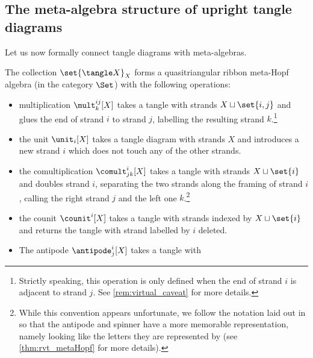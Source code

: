 \subsection{The meta-algebra structure of upright tangle diagrams}

Let us now formally connect tangle diagrams with meta-algebras.

\begin{theorem}
        \label{thm:tangles_meta_algebra}
        The collection $\set{\tangle X}_X$ forms a quasitriangular ribbon
        meta-Hopf algebra (in the category $\Set$) with the following
        operations:
        \begin{itemize}
                \item multiplication $\mult^{ij}_{k}[X]$ takes a tangle with
                        strands $X\sqcup\set{i,j}$ and glues the end of strand
                        $i$ to strand $j$, labelling the resulting strand
                        $k$.\footnote{Strictly speaking, this operation is only
                        defined when the end of strand $i$ is adjacent to strand
                        $j$. See \cref{rem:virtual_caveat} for more details.%
                }
                \item the unit $\unit_{i}[X]$ takes a tangle diagram with
                        strands $X$ and introduces a new strand $i$ which does
                        not touch any of the other strands.
                \item the comultiplication $\comult^{i}_{jk}[X]$ takes a tangle
                        with strands $X\sqcup \set{i}$ and doubles strand $i$,
                        separating the two strands along the framing of strand
                        $i$, calling the right strand $j$ and the left one
                        $k$.\footnote{While this convention appears unfortunate,
                        we follow the notation laid out in \cite{BV} so that the
                        antipode and spinner have a more memorable
                        representation, namely looking like the letters they are
                        represented by (see \cref{thm:rvt_metaHopf} for more
                        details).
                }
                \item the counit $\counit^{i}[X]$ takes a tangle with strands
                        indexed by $X\sqcup \set{i}$ and returns the tangle with
                        strand labelled by $i$ deleted.
                \item The antipode $\antipode^{i}_{j}[X]$ takes a tangle with

\end{itemize}
\end{theorem}
